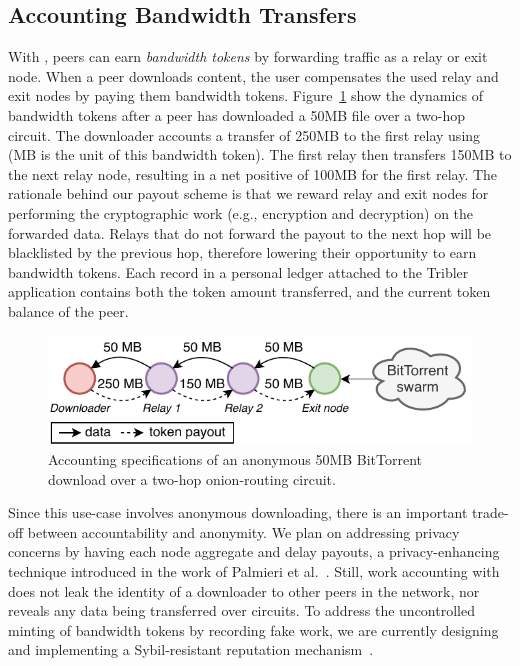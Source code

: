 \subsection{Accounting Bandwidth Transfers}
With \ModelName{}, peers can earn \emph{bandwidth tokens} by forwarding traffic as a relay or exit node.
When a peer downloads content, the user compensates the used relay and exit nodes by paying them bandwidth tokens.
Figure~\ref{fig:payouts} show the dynamics of bandwidth tokens after a peer has downloaded a 50MB file over a two-hop circuit.
The downloader accounts a transfer of 250MB to the first relay using \ModelName{} (MB is the unit of this bandwidth token).
The first relay then transfers 150MB to the next relay node, resulting in a net positive of 100MB for the first relay.
The rationale behind our payout scheme is that we reward relay and exit nodes for performing the cryptographic work (e.g., encryption and decryption) on the forwarded data.
Relays that do not forward the payout to the next hop will be blacklisted by the previous hop, therefore lowering their opportunity to earn bandwidth tokens.
Each record in a personal ledger attached to the Tribler application contains both the token amount transferred, and the current token balance of the peer.

\begin{figure}[t]
	\centering
	\includegraphics[width=.8\linewidth]{trustchain/assets/payouts}
	\caption{Accounting specifications of an anonymous 50MB BitTorrent download over a two-hop onion-routing circuit.}
	\label{fig:payouts}
\end{figure}

Since this use-case involves anonymous downloading, there is an important trade-off between accountability and anonymity.
We plan on addressing privacy concerns by having each node aggregate and delay payouts, a privacy-enhancing technique introduced in the work of Palmieri et al.~\cite{palmieri2015paying}.
Still, work accounting with \ModelName{} does not leak the identity of a downloader to other peers in the network, nor reveals any data being transferred over circuits.
To address the uncontrolled minting of bandwidth tokens by recording fake work, we are currently designing and implementing a Sybil-resistant reputation mechanism~\cite{otte2017trustchain}.

